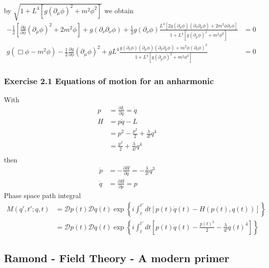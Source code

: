 \documentclass[10pt,a4paper]{book}
\theoremstyle{definition}
\begin{document}
by $\sqrt{1+L^4[g(\partial_\mu\phi)^2+m^2\phi^2]}$ we obtain
\begin{align}
-\frac{1}{2}\left[\frac{\partial g}{\partial\phi}(\partial_\mu\phi)^2+2m^2\phi\right]+g(\partial_\nu\partial_\nu\phi)+\frac{1}{2}g(\partial_\nu\phi)\frac{L^4[2g(\partial_\mu\phi)(\partial_\nu\partial_\mu\phi)+2m^2\phi\partial_\nu\phi]}{1+L^4[g(\partial_\mu\phi)^2+m^2\phi^2]}&=0\\
%
g(\Box\phi-m^2\phi)-\frac{1}{2}\frac{\partial g}{\partial\phi}(\partial_\mu\phi)^2+gL^4\frac{g(\partial_\nu\phi)(\partial_\mu\phi)(\partial_\nu\partial_\mu\phi)+m^2\phi(\partial_\nu\phi)^2}{1+L^4[g(\partial_\mu\phi)^2+m^2\phi^2]}&=0
\end{align}

\subsubsection{Exercise 2.1 Equations of motion for an anharmonic}
With
\begin{align}
p
&=\frac{\partial L}{\partial \dot{q}}=\dot{q}\\
H
&=p\dot{q}-L\\
&=p^2-\frac{p^2}{2}+\frac{\lambda}{4!}q^4\\
&=\frac{p^2}{2}+\frac{\lambda}{4!}q^4\\
\end{align}
then
\begin{align}
\dot{p}&=-\frac{\partial H}{\partial q}=-\frac{\lambda}{3!}q^3\\
\dot{q}&=\frac{\partial H}{\partial p}=p
\end{align}
Phase space path integral
\begin{align}
M(q',t';q,t)
&=\mathcal{D}p(t)\mathcal{D}q(t)\exp\left\{i\int_t^{t'}dt[p(t)\dot{q}(t)-H(p(t),q(t))]\right\}\\
&=\mathcal{D}p(t)\mathcal{D}q(t)\exp\left\{i\int_t^{t'}dt[p(t)\dot{q}(t)-\frac{p(t)^2}{2}-\frac{\lambda}{4!}q(t)^4]\right\}
\end{align}



\subsection{{\sc Ramond} - Field Theory - A modern primer} 
\end{document}
